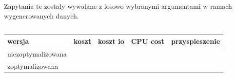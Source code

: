 \documentclass[11pt]{article}
\numberwithin{figure}{subsection}
\begin{document}
		\begin{tabularx}{\textwidth}{|X|X|X|X|X|X|}
		\end{tabularx}
		

		
		
		
		
		
		
		
		
		
		
	
	\subsection{}
			
		\begin{lstlisting}[caption={Wersja niezoptymalizowana},captionpos=b]
		\end{lstlisting}
			
		\begin{lstlisting}[caption={Wersja zoptymalizowana},captionpos=b]
		\end{lstlisting}
		
		Zapytania te zostały wywołane z losowo wybranymi argumentami w ramach
		wygenerowanych danych. \\
		
		\begin{lstlisting}[caption={Wywołanie zapytań}, captionpos=b]
		\end{lstlisting}
		
		\begin{tabularx}{\textwidth}{|X|X|X|X|X|}
			\hline
			wersja & koszt & koszt io & CPU cost & przyspieszenie \\
			\hline
			niezoptymalizowana &  &  &  &  \\
			\hline
			zoptymalizowana &  &  &  &  \\
			\hline
		\end{tabularx}
		
		\begin{tabularx}{\textwidth}{|X|X|X|X|X|X|}
		\end{tabularx}
		
		\begin{tabularx}{\textwidth}{|X|X|X|X|X|X|}
		\end{tabularx}
		

		
		
		
		
		
		
		

\newpage
\printbibliography
\end{document}
